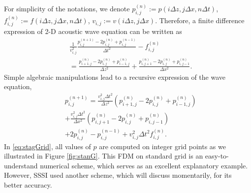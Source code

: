 \documentclass[11pt]{article}
\theoremstyle{plain}
\theoremstyle{definition}
\theoremstyle{remark}
\numberwithin{equation}{section}
\begin{document}
For simplicity of the notations, we denote $p_{i,j}^{(n)}:=  p(i\Delta z, j\Delta x, n\Delta t)$, $f_{i,j}^{(n)} := f(i\Delta z, j\Delta x, n\Delta t)$, $v_{i,j} := v(i\Delta z, j\Delta x)$.
 Therefore, a finite difference expression of 2-D acoustic wave equation can be written as 
  \begin{equation}
    \begin{aligned}
    &\frac{1}{v_{i,j}^2}\frac{p_{i,j}^{(n+1)} - 2p_{i,j}^{(n)} + p_{i,j}^{(n-1)}}{\Delta t^2} - f_{i,j}^{(n)} \\
    &= \frac{p_{i+1,j}^{(n)} - 2p_{i,j}^{(n)} + p_{i-1,j}^{(n)}}{\Delta z^2} + \frac{p_{i,j+1}^{(n)} - 2p_{i,j}^{(n)} + p_{i,j-1}^{(n)}}{\Delta x^2}.
    \end{aligned}
  \end{equation}
Simple algebraic manipulations lead to a recursive expression of the wave equation,
  \begin{equation}
  \label{eq:stagGrid}
    \begin{aligned}
    &p_{i,j}^{(n+1)} = \frac{v_{i,j}^2\Delta t^2}{\Delta z^2}\left(p_{i+1,j}^{(n)} - 2p_{i,j}^{(n)} + p_{i-1,j}^{(n)}\right)\\
    &+ \frac{v_{i,j}^2\Delta t^2}{\Delta x^2}\left(p_{i,j+1}^{(n)} - 2p_{i,j}^{(n)} + p_{i,j-1}^{(n)}\right)\\
    &+ 2p_{i,j}^{(n)}-p_{i,j}^{(n-1)} + v_{i,j}^2\Delta t^2 f_{i,j}^{(n)}.
    \end{aligned}
  \end{equation}
  In \eqref{eq:stagGrid}, all values of $p$ are computed on integer grid points as we illustrated in Figure \ref{fig:stanG}. This FDM on standard grid is an easy-to-understand numerical scheme, which serves as an excellent explanatory example. However, SSSI used another scheme, which will discuss momentarily, for its better accuracy.  
  
\end{document}

